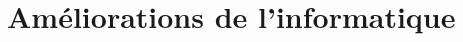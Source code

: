 \documentclass[\main/main.tex]{subfiles}
\begin{document}
\chapter{Améliorations de l'informatique}




\end{document}
